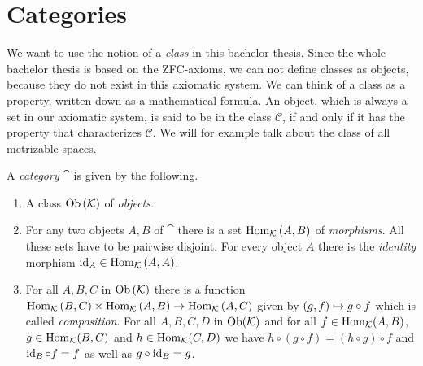 \section{Categories}

We want to use the notion of a \textit{class} in this bachelor thesis. Since the whole bachelor thesis is based on the ZFC-axioms, we can not define classes as objects, because they do not exist in this axiomatic system. We can think of a class as a property, written down as a mathematical formula. An object, which is always a set in our axiomatic system, is said to be in the class $\mathcal{C}$, if and only if it has the property that characterizes $\mathcal{C}$. We will for example talk about the class of all metrizable spaces. 


\begin{definition}
	A \textit{category} $\cat$ is given by the following.
	\begin{enumerate}
		\item A class $\operatorname{Ob}{\left ( \mathcal K \right )}$ of \textit{objects}.
		\item For any two objects $A, B$ of $\cat$ there is a set $\operatorname{Hom}_\mathcal K{\left ( A, B \right )}$ of \textit{morphisms}. All these sets have to be pairwise disjoint. For every object $A$ there is the \textit{identity} morphism $\operatorname{id}_A \in \operatorname{Hom}_\mathcal K{\left ( A, A \right )}$.
		\item For all $A, B, C$ in $\operatorname{Ob}{\left ( \mathcal K \right )}$ there is a function $\operatorname{Hom}_\mathcal K{\left ( B, C \right )} \times \operatorname{Hom}_\mathcal K{\left ( A, B \right )} \to \operatorname{Hom}_\mathcal K{\left ( A, C \right )}$ given by ${\left ( g, f \right )} \mapsto g \circ f$ which is called \textit{composition}. For all $A, B, C, D$ in $\operatorname{Ob}(\mathcal K)$ and for all $f \in \operatorname{Hom}_\mathcal K(A, B)$, $g \in \operatorname{Hom}_\mathcal K(B,C)$ and $h \in \operatorname{Hom}_\mathcal K(C,D)$ we have $h \circ (g \circ f) = (h \circ g) \circ f$ and $\operatorname{id}_B \circ f = f$ as well as $g \circ \operatorname{id}_B = g$. 
	\end{enumerate}
\end{definition}


